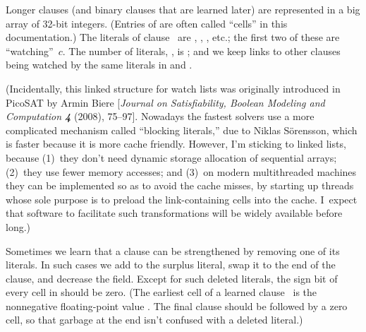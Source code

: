 Longer clauses (and binary clauses that are learned later) are
represented in a big array  of 32-bit integers. (Entries of 
are often called ``cells'' in this documentation.) The literals
of clause~ are , , , etc.;
the first two of these are ``watching''~$c$. The number of literals,
, is ; and we keep links to
other clauses
being watched by the same literals in  and
.

(Incidentally, this linked structure for watch lists was originally introduced
in PicoSAT by Armin Biere [{\sl Journal on Satisfiability, Boolean Modeling
and Computation\/ \bf4} (2008), 75--97]. Nowadays the fastest solvers
use a more complicated mechanism called ``blocking literals,'' due to Niklas
S\"orensson, which is faster because it is more cache friendly. However,
I'm sticking to linked lists, because (1)~they don't need dynamic storage
allocation of sequential arrays; (2)~they use fewer memory accesses; and
(3)~on modern multithreaded machines they can be implemented so as to avoid the
cache misses, by starting up threads whose sole purpose is to preload the
link-containing cells into the cache. I~expect that software to facilitate
such transformations will be widely available before long.)

Sometimes we learn that a clause can be strengthened by removing
one of its literals. In such cases we add  to the surplus
literal, swap it to the end of the clause, and decrease the 
field.
Except for such deleted literals, the sign bit of every cell in 
should
be zero. (The earliest cell of a learned clause~ is the nonnegative
floating-point value .
The final clause should be followed by a zero cell,
so that garbage at the end isn't confused with a deleted literal.)

